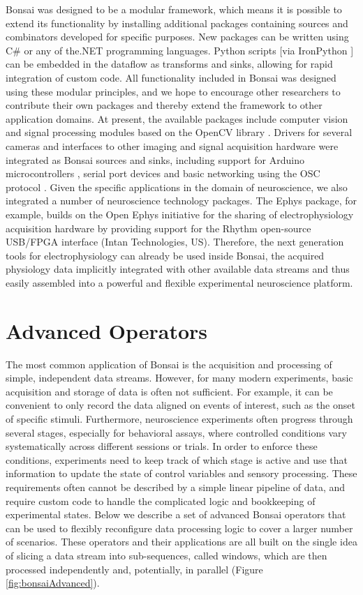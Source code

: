 Bonsai was designed to be a modular framework, which means it is possible to extend its functionality by installing additional packages containing sources and combinators developed for specific purposes. New packages can be written using C\# or any of the.NET programming languages. Python scripts [via IronPython \cite{IronPython2014}] can be embedded in the dataflow as transforms and sinks, allowing for rapid integration of custom code. All functionality included in Bonsai was designed using these modular principles, and we hope to encourage other researchers to contribute their own packages and thereby extend the framework to other application domains. At present, the available packages include computer vision and signal processing modules based on the OpenCV library \cite{Itseez2014}. Drivers for several cameras and interfaces to other imaging and signal acquisition hardware were integrated as Bonsai sources and sinks, including support for Arduino microcontrollers \cite{Banzi2014}, serial port devices and basic networking using the OSC protocol \cite{Wright2003}. Given the specific applications in the domain of neuroscience, we also integrated a number of neuroscience technology packages. The Ephys package, for example, builds on the Open Ephys initiative for the sharing of electrophysiology acquisition hardware \cite{Voigts2013} by providing support for the Rhythm open-source USB/FPGA interface (Intan Technologies, US). Therefore, the next generation tools for electrophysiology can already be used inside Bonsai, the acquired physiology data implicitly integrated with other available data streams and thus easily assembled into a powerful and flexible experimental neuroscience platform.

\section{Advanced Operators}

The most common application of Bonsai is the acquisition and processing of simple, independent data streams. However, for many modern experiments, basic acquisition and storage of data is often not sufficient. For example, it can be convenient to only record the data aligned on events of interest, such as the onset of specific stimuli. Furthermore, neuroscience experiments often progress through several stages, especially for behavioral assays, where controlled conditions vary systematically across different sessions or trials. In order to enforce these conditions, experiments need to keep track of which stage is active and use that information to update the state of control variables and sensory processing. These requirements often cannot be described by a simple linear pipeline of data, and require custom code to handle the complicated logic and bookkeeping of experimental states. Below we describe a set of advanced Bonsai operators that can be used to flexibly reconfigure data processing logic to cover a larger number of scenarios. These operators and their applications are all built on the single idea of slicing a data stream into sub-sequences, called windows, which are then processed independently and, potentially, in parallel (Figure \ref{fig:bonsaiAdvanced}).

